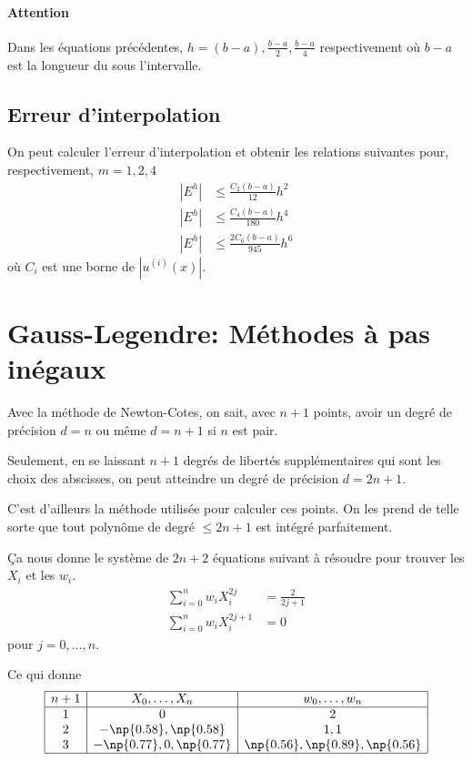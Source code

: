 \paragraph{Attention}
Dans les équations précédentes, $h = (b-a), \frac{b-a}{2}, \frac{b-a}{4}$
respectivement où $b-a$ est la longueur du sous l'intervalle.

\subsection{Erreur d'interpolation}
On peut calculer l'erreur d'interpolation et obtenir les relations suivantes
pour, respectivement, $m = 1, 2, 4$
\begin{align*}
  |E^h| & \leq \frac{C_2(b-a)}{12}h^2\\
  |E^h| & \leq \frac{C_4(b-a)}{180}h^4\\
  |E^h| & \leq \frac{2C_6(b-a)}{945}h^6
\end{align*}
où $C_i$ est une borne de $|u^{(i)}(x)|$.

\section{Gauss-Legendre: Méthodes à pas inégaux}
Avec la méthode de Newton-Cotes, on sait, avec $n+1$ points, avoir
un degré de précision $d = n$ ou même $d = n+1$ si $n$ est pair.

Seulement, en se laissant $n+1$ degrés de libertés supplémentaires
qui sont les choix des abscisses, on peut atteindre
un degré de précision $d = 2n+1$.

C'est d'ailleurs la méthode utilisée pour calculer ces points.
On les prend de telle sorte que tout polynôme de degré $\leq 2n+1$ est
intégré parfaitement.

Ça nous donne le système de $2n+2$ équations suivant à résoudre
pour trouver les $X_i$ et les $w_i$.
\begin{align*}
  \sum_{i=0}^n w_i X_i^{2j} & = \frac{2}{2j+1}\\
  \sum_{i=0}^n w_i X_i^{2j+1} & = 0
\end{align*}
pour $j = 0, \ldots, n$.

Ce qui donne
\[
  \begin{array}{|c|c|c|}
    \hline
    n+1 & X_0, \ldots, X_n & w_0, \ldots, w_n\\
    \hline
    1 & 0 & 2\\
    2 & -\np{0.58}, \np{0.58} & 1, 1\\
    3 & -\np{0.77}, 0, \np{0.77} & \np{0.56}, \np{0.89}, \np{0.56}\\
    \hline
  \end{array}
\]

